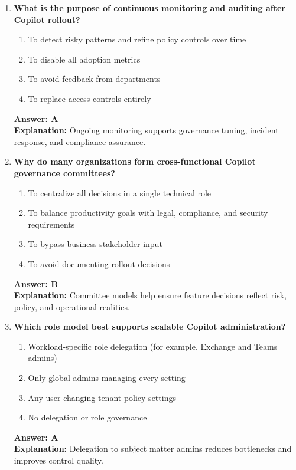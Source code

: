 \documentclass[10pt]{article}
\begin{document}
\begin{enumerate}[leftmargin=*]
\item \textbf{What is the purpose of continuous monitoring and auditing after Copilot rollout?}
\begin{enumerate}[label=\Alph*.]
  \item To detect risky patterns and refine policy controls over time
  \item To disable all adoption metrics
  \item To avoid feedback from departments
  \item To replace access controls entirely
\end{enumerate}
\textbf{Answer: A}\\
\textbf{Explanation:} Ongoing monitoring supports governance tuning, incident response, and compliance assurance.

\item \textbf{Why do many organizations form cross-functional Copilot governance committees?}
\begin{enumerate}[label=\Alph*.]
  \item To centralize all decisions in a single technical role
  \item To balance productivity goals with legal, compliance, and security requirements
  \item To bypass business stakeholder input
  \item To avoid documenting rollout decisions
\end{enumerate}
\textbf{Answer: B}\\
\textbf{Explanation:} Committee models help ensure feature decisions reflect risk, policy, and operational realities.

\item \textbf{Which role model best supports scalable Copilot administration?}
\begin{enumerate}[label=\Alph*.]
  \item Workload-specific role delegation (for example, Exchange and Teams admins)
  \item Only global admins managing every setting
  \item Any user changing tenant policy settings
  \item No delegation or role governance
\end{enumerate}
\textbf{Answer: A}\\
\textbf{Explanation:} Delegation to subject matter admins reduces bottlenecks and improves control quality.


\end{enumerate}
\end{document}
